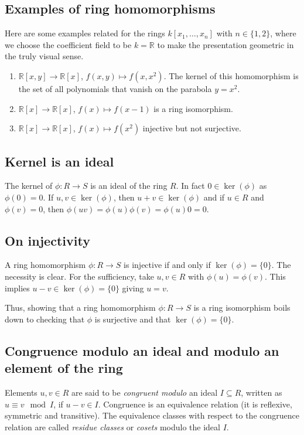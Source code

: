 \documentclass[11pt,a4paper]{amsart}
\newcommand{\R}{{\mathbb{R}}}
\begin{document}
\subsection{Examples of ring homomorphisms} Here are some examples related for the rings $k[x_1,\ldots,x_n]$ with $n \in \{1,2\}$, where we choose the coefficient field to be $k = \R$ to make the presentation geometric in the truly visual sense. 
\begin{enumerate} 
	\item $\R[x,y] \to \R[x]$, $f(x,y) \mapsto f(x,x^2)$. The kernel of this homomorphism is the set of all polynomials that vanish on the parabola $y = x^2$. 
	\item $\R[x] \to \R[x]$, $f(x) \mapsto f(x-1)$ is a ring isomorphism.  
	\item $\R[x] \to \R[x]$, $f(x) \mapsto f(x^2)$ injective but  not surjective.  
\end{enumerate} 

\subsection{Kernel is an ideal} The kernel of $\phi : R \to S$ is an ideal of the ring $R$. In fact $0 \in \ker (\phi)$ as $\phi(0) = 0$. If $u,v \in \ker (\phi)$, then $u+v \in \ker (\phi)$ and if $u \in R$ and $\phi(v) = 0$, then $\phi(u v) = \phi(u) \phi(v) = \phi(u) 0 = 0$. 

\subsection{On injectivity} A ring homomorphism $\phi : R \to S$ is injective if and only if $\ker (\phi) = \{0\}$. The necessity is clear. For the sufficiency, take $u,v \in R$ with $\phi(u) = \phi(v)$. This implies $u-v \in \ker (\phi ) = \{0\}$ giving $u=v$. 

Thus, showing that a ring homomorphism  $\phi : R \to S$ is a ring isomorphism boils down to checking that $\phi$ is surjective and that $\ker (\phi) = \{0\}$. 

\subsection{Congruence modulo an ideal and modulo an element of the ring}  Elements $u,v \in R$ are said to be \emph{congruent modulo} an ideal $I \subseteq R$, written as $u \equiv v \mod I$, if $u - v \in I$. Congruence is an equivalence relation (it is reflexive, symmetric and transitive). The equivalence classes with respect to the congruence relation are called \emph{residue classes} or \emph{cosets} modulo the ideal $I$. 
\end{document}
